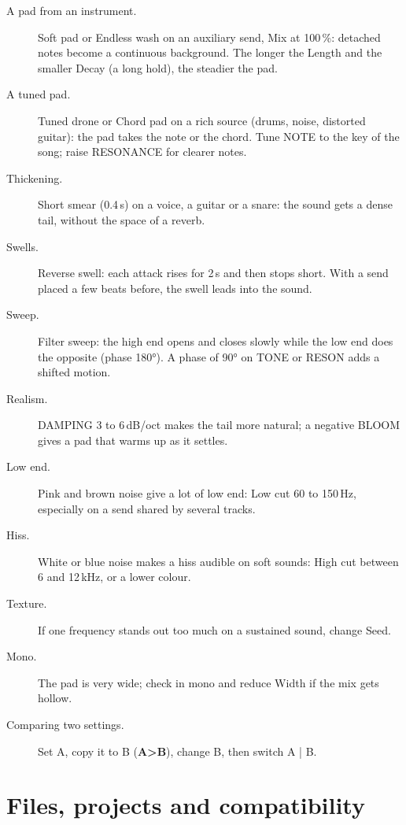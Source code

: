 \documentclass[a4paper,11pt]{article}
\newcommand{\ctl}[1]{\textsf{\textbf{#1}}}   %
\newcommand{\dB}{\,dB}
\begin{document}
\begin{description}
\item[A pad from an instrument.] Soft pad or Endless wash on an auxiliary send, Mix at 100\,\%:
  detached notes become a continuous background. The longer the Length and the smaller Decay (a long
  hold), the steadier the pad.
\item[A tuned pad.] Tuned drone or Chord pad on a rich source (drums, noise, distorted guitar): the
  pad takes the note or the chord. Tune NOTE to the key of the song; raise RESONANCE for clearer
  notes.
\item[Thickening.] Short smear (0.4\,s) on a voice, a guitar or a snare: the sound gets a dense
  tail, without the space of a reverb.
\item[Swells.] Reverse swell: each attack rises for 2\,s and then stops short. With a send placed
  a few beats before, the swell leads into the sound.
\item[Sweep.] Filter sweep: the high end opens and closes slowly while the low end does the
  opposite (phase 180°). A phase of 90° on TONE or RESON adds a shifted motion.
\item[Realism.] DAMPING 3 to 6\dB/oct makes the tail more natural; a negative BLOOM gives a pad
  that warms up as it settles.
\item[Low end.] Pink and brown noise give a lot of low end: Low cut 60 to 150\,Hz, especially on a
  send shared by several tracks.
\item[Hiss.] White or blue noise makes a hiss audible on soft sounds: High cut between 6 and
  12\,kHz, or a lower colour.
\item[Texture.] If one frequency stands out too much on a sustained sound, change Seed.
\item[Mono.] The pad is very wide; check in mono and reduce Width if the mix gets hollow.
\item[Comparing two settings.] Set A, copy it to B (\ctl{A>B}), change B, then switch A | B.
\end{description}

\section{Files, projects and compatibility}\label{sec:files}
\end{document}
